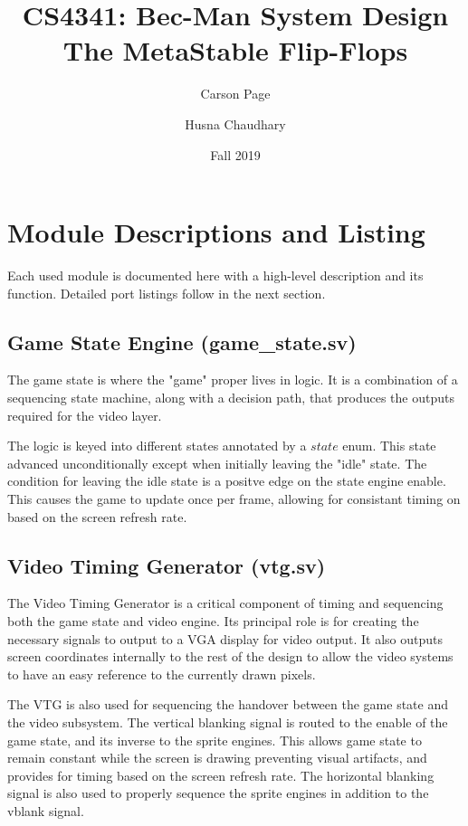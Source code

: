 \documentclass[12pt]{article}
\title{
    CS4341: Bec-Man System Design \\
    \large The MetaStable Flip-Flops}
\author{Carson Page \and Husna Chaudhary}
\date{Fall 2019}
\begin{document}
\begin{titlepage}
    \maketitle
\end{titlepage}
\tableofcontents
\newpage

\setlength{\parskip}{0.5em}

\section{Module Descriptions and Listing}
Each used module is documented here with a high-level description and its
function. Detailed port listings follow in the next section.

\subsection{Game State Engine (game\_state.sv)}
The game state is where the "game" proper lives in logic. It is a combination of
a sequencing state machine, along with a decision path, that produces the
outputs required for the video layer.

The logic is keyed into different states annotated by a $state$ enum. This state
advanced unconditionally except when initially leaving the "idle" state. The
condition for leaving the idle state is a positve edge on the state engine
enable. This causes the game to update once per frame, allowing for consistant
timing on based on the screen refresh rate.

\subsection{Video Timing Generator (vtg.sv)}
The Video Timing Generator is a critical component of timing and sequencing both the game state and
video engine. Its principal role is for creating the necessary signals to output
to a VGA display for video output. It also outputs screen coordinates internally
to the rest of the design to allow the video systems to have an easy reference
to the currently drawn pixels.

The VTG is also used for sequencing the handover between the game state and the
video subsystem. The vertical blanking signal is routed to the enable of the
game state, and its inverse to the sprite engines. This allows game state to
remain constant while the screen is drawing preventing visual artifacts, and
provides for timing based on the screen refresh rate. The horizontal blanking
signal is also used to properly sequence the sprite engines in addition to the
vblank signal.
\end{document}
